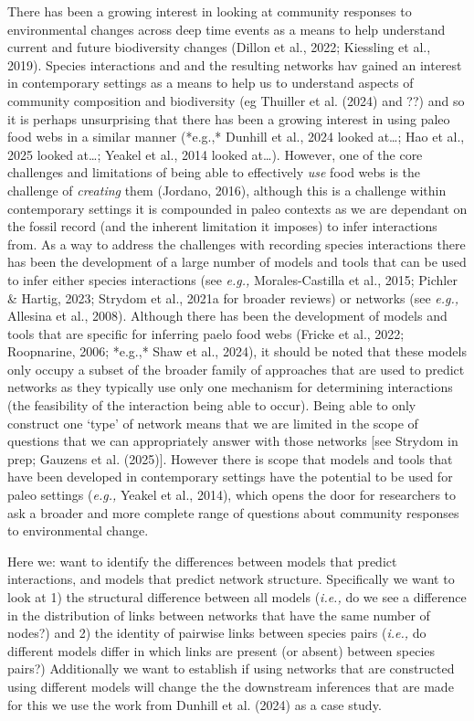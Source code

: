 \documentclass[
]{article}
\begin{document}
There has been a growing interest in looking at community responses to
environmental changes across deep time events as a means to help
understand current and future biodiversity changes (Dillon et al., 2022;
Kiessling et al., 2019). Species interactions and and the resulting
networks hav gained an interest in contemporary settings as a means to
help us to understand aspects of community composition and biodiversity
(eg Thuiller et al. (2024) and ??) and so it is perhaps unsurprising
that there has been a growing interest in using paleo food webs in a
similar manner (*e.g.,* Dunhill et al., 2024 looked at\ldots; Hao et
al., 2025 looked at\ldots; Yeakel et al., 2014 looked at\ldots).
However, one of the core challenges and limitations of being able to
effectively \emph{use} food webs is the challenge of \emph{creating}
them (Jordano, 2016), although this is a challenge within contemporary
settings it is compounded in paleo contexts as we are dependant on the
fossil record (and the inherent limitation it imposes) to infer
interactions from. As a way to address the challenges with recording
species interactions there has been the development of a large number of
models and tools that can be used to infer either species interactions
(see \emph{e.g.,} Morales-Castilla et al., 2015; Pichler \& Hartig,
2023; Strydom et al., 2021a for broader reviews) or networks (see
\emph{e.g.,} Allesina et al., 2008). Although there has been the
development of models and tools that are specific for inferring paelo
food webs (Fricke et al., 2022; Roopnarine, 2006; *e.g.,* Shaw et al.,
2024), it should be noted that these models only occupy a subset of the
broader family of approaches that are used to predict networks as they
typically use only one mechanism for determining interactions (the
feasibility of the interaction being able to occur). Being able to only
construct one `type' of network means that we are limited in the scope
of questions that we can appropriately answer with those networks {[}see
Strydom in prep; Gauzens et al. (2025){]}. However there is scope that
models and tools that have been developed in contemporary settings have
the potential to be used for paleo settings (\emph{e.g.,} Yeakel et al.,
2014), which opens the door for researchers to ask a broader and more
complete range of questions about community responses to environmental
change.

Here we: want to identify the differences between models that predict
interactions, and models that predict network structure. Specifically we
want to look at 1) the structural difference between all models
(\emph{i.e.,} do we see a difference in the distribution of links
between networks that have the same number of nodes?) and 2) the
identity of pairwise links between species pairs (\emph{i.e.,} do
different models differ in which links are present (or absent) between
species pairs?) Additionally we want to establish if using networks that
are constructed using different models will change the the downstream
inferences that are made for this we use the work from Dunhill et al.
(2024) as a case study.
\end{document}
